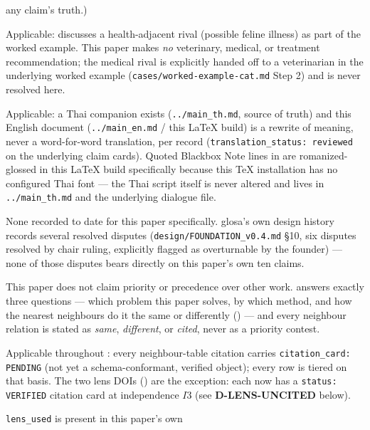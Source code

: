 \begin{disclaimers}
    any claim's truth.)
  \item[D-NOT-DIAGNOSTIC] Applicable:  discusses a health-adjacent rival
    (possible feline illness) as part of the worked example. This paper makes \emph{no} veterinary,
    medical, or treatment recommendation; the medical rival is explicitly handed off to a
    veterinarian in the underlying worked example (\texttt{cases/worked-example-cat.md} Step 2) and
    is never resolved here.
  \item[D-TRANSLATION] Applicable: a Thai companion exists (\texttt{../main\_th.md}, source of
    truth) and this English document (\texttt{../main\_en.md} / this LaTeX build) is a rewrite of
    meaning, never a word-for-word translation, per record (\texttt{translation\_status: reviewed}
    on the underlying claim cards). Quoted Blackbox Note lines in  are
    romanized-glossed in this LaTeX build specifically because this TeX installation has no
    configured Thai font — the Thai script itself is never altered and lives in
    \texttt{../main\_th.md} and the underlying dialogue file.
  \item[D-DISSENT-PRESERVED] None recorded to date for this paper specifically. glosa's own design
    history records several resolved disputes (\texttt{design/FOUNDATION\_v0.4.md} \S10, six
    disputes resolved by chair ruling, explicitly flagged as overturnable by the founder) — none of
    those disputes bears directly on this paper's own ten claims.
  \item[D-COMPARISON] This paper does not claim priority or precedence over other work.
     answers exactly three questions — which problem this paper solves, by which
    method, and how the nearest neighbours do it the same or differently () —
    and every neighbour relation is stated as \emph{same}, \emph{different}, or \emph{cited}, never
    as a priority contest.
  \item[D-CITATION-UNVERIFIED] Applicable throughout : every neighbour-table
    citation carries \texttt{citation\_card: PENDING} (not yet a schema-conformant, verified
    object); every row is tiered \OpenTier{} on that basis. The two lens DOIs
    (\citep{lahtee2026genesis,lahtee2026zeroreadout}) are the exception: each now has a
    \texttt{status: VERIFIED} citation card at independence \(I3\) (see \textbf{D-LENS-UNCITED}
    below).
  \item[D-LENS-UNCITED --- closed 2026-09-04] \texttt{lens\_used} is present in this paper's own

\end{disclaimers}

